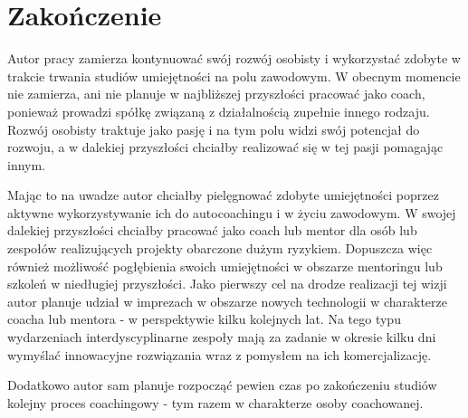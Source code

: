 \chapter{Zakończenie}


Autor pracy zamierza kontynuować swój rozwój osobisty i wykorzystać zdobyte w trakcie trwania studiów umiejętności na polu zawodowym.
W obecnym momencie nie zamierza, ani nie planuje w najbliższej przyszłości pracować jako coach, ponieważ prowadzi spółkę związaną z działalnością
zupełnie innego rodzaju. Rozwój osobisty traktuje jako pasję i na tym polu widzi swój potencjał do rozwoju, a w dalekiej przyszłości
chciałby realizować się w tej pasji pomagając innym.

Mając to na uwadze autor chciałby pielęgnować zdobyte umiejętności poprzez aktywne wykorzystywanie ich do autocoachingu i w życiu zawodowym.
W swojej dalekiej przyszłości chciałby pracować jako coach lub mentor dla osób lub zespołów realizujących projekty obarczone dużym ryzykiem.
Dopuszcza więc również możliwość pogłębienia swoich umiejętności w obszarze mentoringu lub szkoleń w niedługiej przyszłości.
Jako pierwszy cel na drodze realizacji tej wizji autor planuje udział w imprezach w obszarze nowych technologii
w charakterze coacha lub mentora - w perspektywie kilku kolejnych lat. Na tego typu wydarzeniach interdyscyplinarne zespoły mają za zadanie
w okresie kilku dni wymyślać innowacyjne rozwiązania wraz z pomysłem na ich komercjalizację.

Dodatkowo autor sam planuje rozpocząć pewien czas po zakończeniu studiów kolejny proces coachingowy - tym razem w charakterze osoby coachowanej.
